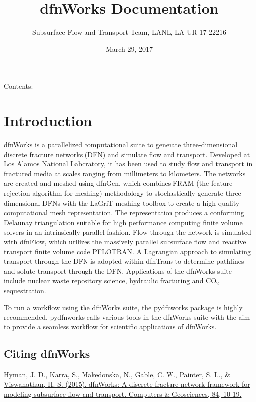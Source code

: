 \documentclass[letterpaper,10pt,english]{sphinxmanual}
\title{dfnWorks Documentation}
\date{March 29, 2017}
\author{Subsurface Flow and Transport Team, LANL, LA-UR-17-22216}
\begin{document}
\maketitle
\tableofcontents
{}\label{index::doc}


Contents:


\chapter{Introduction}
\label{intro:introduction}\label{intro:welcome-to-dfnworks-2-0-documentation}\label{intro::doc}
dfnWorks is a parallelized computational suite to generate three-dimensional
discrete fracture networks (DFN) and simulate flow and transport. Developed at
Los Alamos National Laboratory, it has been used to study flow and transport
in fractured media at scales ranging from millimeters to kilometers. The
networks are created and meshed using dfnGen, which combines FRAM (the feature
rejection algorithm for meshing) methodology to stochastically generate
three-dimensional DFNs with the LaGriT meshing toolbox to create a high-quality
computational mesh representation. The representation produces a conforming
Delaunay triangulation suitable for high performance computing finite volume
solvers in an intrinsically parallel fashion. Flow through the network is
simulated with dfnFlow, which utilizes the massively parallel subsurface flow
and reactive transport finite volume code PFLOTRAN. A Lagrangian approach to
simulating transport through the DFN is adopted within dfnTrans to determine
pathlines and solute transport through the DFN. Applications of the dfnWorks
suite include nuclear waste repository science, hydraulic fracturing and
CO$_{\text{2}}$ sequestration.

To run a workflow using the dfnWorks suite, the pydfnworks package is
highly recommended. pydfnworks calls various tools in the dfnWorks suite with
the aim to provide a seamless workflow for scientific applications of dfnWorks.


\section{Citing dfnWorks}
\label{intro:citing-dfnworks}
\href{http://www.sciencedirect.com/science/article/pii/S0098300415300261/}{Hyman, J. D., Karra, S., Makedonska, N., Gable, C. W., Painter, S. L., \&
Viswanathan, H. S. (2015). dfnWorks: A discrete fracture network framework
for modeling subsurface flow and transport. Computers \& Geosciences, 84,
10-19.}
\end{document}
